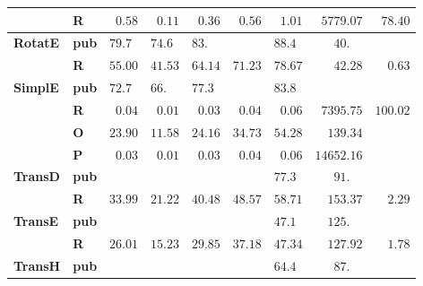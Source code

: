 \begin{tabular}{llrrrrrrr}
       & \textbf{R} &  $\phantom{0}0.58$ &  $\phantom{0}0.11$ &  $\phantom{0}0.36$ &  $\phantom{0}0.56$ &  $\phantom{0}1.01$ &            $\phantom{0}5779.07$ &  $\phantom{0}78.40$ \\\midrule
\textbf{RotatE} & \textbf{pub} &  $79.7\phantom{0}$ &  $74.6\phantom{0}$ &  $83.\phantom{00}$ &                    &  $88.4\phantom{0}$ &  $\phantom{000}40.\phantom{00}$ &                     \\
       & \textbf{R} &            $55.00$ &            $41.53$ &            $64.14$ &            $71.23$ &            $78.67$ &            $\phantom{000}42.28$ &  $\phantom{00}0.63$ \\\midrule
\textbf{SimplE} & \textbf{pub} &  $72.7\phantom{0}$ &  $66.\phantom{00}$ &  $77.3\phantom{0}$ &                    &  $83.8\phantom{0}$ &                                 &                     \\
       & \textbf{R} &  $\phantom{0}0.04$ &  $\phantom{0}0.01$ &  $\phantom{0}0.03$ &  $\phantom{0}0.04$ &  $\phantom{0}0.06$ &            $\phantom{0}7395.75$ &            $100.02$ \\
       & \textbf{O} &            $23.90$ &            $11.58$ &            $24.16$ &            $34.73$ &            $54.28$ &            $\phantom{00}139.34$ &                     \\
       & \textbf{P} &  $\phantom{0}0.03$ &  $\phantom{0}0.01$ &  $\phantom{0}0.03$ &  $\phantom{0}0.04$ &  $\phantom{0}0.06$ &                      $14652.16$ &                     \\\midrule
\textbf{TransD} & \textbf{pub} &                    &                    &                    &                    &  $77.3\phantom{0}$ &  $\phantom{000}91.\phantom{00}$ &                     \\
       & \textbf{R} &            $33.99$ &            $21.22$ &            $40.48$ &            $48.57$ &            $58.71$ &            $\phantom{00}153.37$ &  $\phantom{00}2.29$ \\\midrule
\textbf{TransE} & \textbf{pub} &                    &                    &                    &                    &  $47.1\phantom{0}$ &  $\phantom{00}125.\phantom{00}$ &                     \\
       & \textbf{R} &            $26.01$ &            $15.23$ &            $29.85$ &            $37.18$ &            $47.34$ &            $\phantom{00}127.92$ &  $\phantom{00}1.78$ \\\midrule
\textbf{TransH} & \textbf{pub} &                    &                    &                    &                    &  $64.4\phantom{0}$ &  $\phantom{000}87.\phantom{00}$ &                     \\

\end{tabular}
